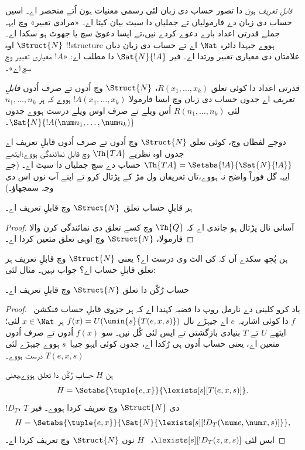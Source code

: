 \documentclass[../../../include/open-logic-section]{subfiles}
\begin{document}


\emph{قابلِ تعریف ہون} دا تصور حساب دی زبان لئی رسمی معنیات
ہون اُتے منحصر اے۔ اسیں حساب دی زبان دے فارمولیاں تے جملیاں
دا سیٹ بیان کیتا اے۔ «مرادی تعبیر» وچ ایہہ جملے قدرتی
اعداد بارے دعوے کردے نیں،تے ایسا دعویٰ سچ یا جھوٹ ہو سکدا
اے۔ $\Struct{N}$ اوہ !!{structure} ہووے جیہدا دائرہ
$\Nat$ اے تے حساب دی زبان دیاں علامتاں دی معیاری تعبیر
ورتدا اے۔ فیر $\Sat{N}{!A}$ دا مطلب اے: «$!A$ معیاری
تعبیر وچ سچ اے»۔

\begin{defn}
قدرتی اعداد دا کوئی تعلق $R(x_1,\dots,x_k)$، $\Struct{N}$
وچ اُدوں تے صرف اُدوں \emph{قابلِ تعریف} اے جدوں حساب دی زبان وچ
ایسا فارمولا $!A(x_1,\dots,x_k)$ ہووے کہ ہر
$n_1,\dots,n_k$ لئی $R(n_1,\dots,n_k)$ اُس ویلے تے
صرف اوس ویلے درست ہووے جدوں $\Sat{N}{!A(\num n_1,\dots,\num
  n_k)}$۔
\end{defn}

دوجے لفظاں وچ، کوئی تعلق $\Struct{N}$ وچ اُدوں تے صرف اُدوں
قابلِ تعریف اے جدوں اوہ نظریے $\Th{TA}$ وچ قابلِ نمائندگی
ہووے؛ایتھے $\Th{TA} =
\Setabs{!A}{\Sat{N}{!A}}$ حساب دے سچ جملیاں دا سیٹ
اے۔ (جے ایہہ گل فوراً واضح نہ ہووے،تاں تعریفاں ول
مڑ کے پڑتال کرو تے اپنے آپ نوں اس دی وجہ سمجھاؤ۔)

\begin{lem}
ہر قابلِ حساب تعلق~$\Struct{N}$ وچ قابلِ تعریف اے۔
\end{lem}

\begin{proof}
آسانی نال پڑتال ہو جاندی اے کہ $\Th{Q}$ وچ کسے تعلق
دی نمائندگی کرن والا فارمولا، $\Struct{N}$ وچ اوہی تعلق
متعین کردا اے۔
\end{proof}

ہن پُچھ سکدے آں کہ کی الٹ وی درست اے؟ یعنی
$\Struct{N}$ وچ قابلِ تعریف ہر تعلق قابلِ حساب اے؟
جواب نہیں۔ مثال لئی:

\begin{lem}
حساب رُکّن دا تعلق $\Struct{N}$ وچ قابلِ تعریف اے۔
\end{lem}

\begin{proof}
یاد کرو کلینی دے نارمل روپ دا قضیہ کہندا اے کہ ہر جزوی
قابلِ حساب فنکشن~$f$ دا کوئی اشاریہ~$e$ اے جیہڑے نال
$f(x) =
U(\umin{s}{T(e,x,s)})$ ہر $x \in \Nat$ لئی؛ایتھے
$U$ تے $T$ بنیادی بازگشتی
تے ایس لئی کُل نیں۔ سو $f(x)$ اُدوں تے صرف اُدوں متعین اے، یعنی حساب اُدوں ہی رُکدا
اے، جدوں کوئی ایہو جیہا~$s$ ہووے جیہڑے لئی
$T(e,x,s)$ درست ہووے۔

ہن $H$ حساب رُکّن دا تعلق ہووے،یعنی
\[
H = \Setabs{\tuple{e,x}}{\lexists[s][T(e, x, s)]}.
\]
$!D_T$، $T$ دی $\Struct{N}$ وچ تعریف کردا ہووے۔ فیر
\[
H = \Setabs{\tuple{e,x}}{\Sat{N}{\lexists[s][!D_T(\num e, \num x, s)]}},
\]
ایس لئی $\lexists[s][!D_T(z, x, s)]$،
~$H$ نوں $\Struct{N}$ وچ تعریف کردا اے۔
\end{proof}
\end{document}
